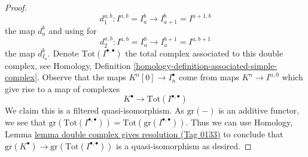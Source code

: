 \documentclass{amsart}
\theoremstyle{plain}
\theoremstyle{definition}
\theoremstyle{remark}
\numberwithin{equation}{subsection}
\begin{document}
\begin{proof}
$$
d_1^{a, b} : I^{a, b} = I_a^b \to I_{a + 1}^b = I^{a + 1, b}
$$
the map $d_a^b$ and using for
$$
d_2^{a, b} : I^{a, b} = I_a^b \to I_a^{b + 1} = I^{a, b + 1}
$$
the map $d_{I_a}^b$. Denote $\text{Tot}(I^{\bullet, \bullet})$
the total complex associated to this double complex, see
Homology, Definition \ref{homology-definition-associated-simple-complex}.
Observe that the maps $K^n[0] \to I_n^\bullet$ come from maps
$K^n \to I^{n, 0}$ which give rise to a map of complexes
$$
K^\bullet \longrightarrow \text{Tot}(I^{\bullet, \bullet})
$$
We claim this is a filtered quasi-isomorphism.
As $\text{gr}(-)$ is an additive functor, we see that
$\text{gr}(\text{Tot}(I^{\bullet, \bullet})) =
\text{Tot}(\text{gr}(I^{\bullet, \bullet}))$.
Thus we can use
Homology,
Lemma \href{https://stacks.math.columbia.edu/tag/0133}{lemma double complex gives resolution (Tag 0133)}
to conclude that
$\text{gr}(K^\bullet) \to \text{gr}(\text{Tot}(I^{\bullet, \bullet}))$
is a quasi-isomorphism as desired.
\end{proof}
\end{document}

